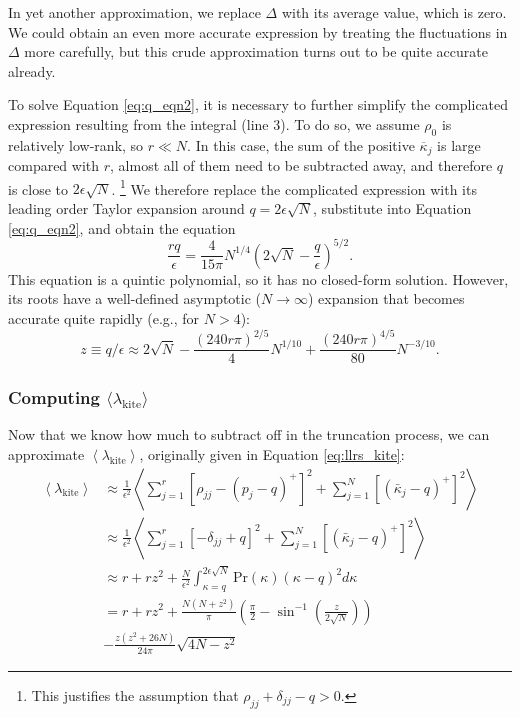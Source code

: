 \documentclass[aps,pra, twocolumn]{revtex4-1}
\newcommand{\expect}[1]{\ensuremath{\left\langle#1\right\rangle}}
\begin{document}
In yet another approximation, we replace $\Delta$ with its average value, which is zero.  We could obtain an even more accurate expression 
 by treating the fluctuations in $\Delta$ more carefully, but this crude approximation turns out to be quite accurate already.

To solve Equation \eqref{eq:q_eqn2}, it is necessary to further simplify the complicated expression resulting from the integral (line 3).  To do so, we 
assume  $\rho_0$ is relatively low-rank, so $r \ll N$.  In this case, the sum of the positive $\overline{\kappa}_j$ is large compared 
with $r$, almost all of them need to be subtracted away, and therefore $q$ is close to $2\epsilon\sqrt{N}$.  \footnote{This justifies the assumption that $\rho_{jj} + \delta_{jj} - q > 0$.} We therefore replace 
the complicated expression with its leading order Taylor expansion around $q=2\epsilon\sqrt{N}$, substitute into Equation \eqref{eq:q_eqn2}, and 
obtain the equation
\begin{equation}
\frac{rq}{\epsilon}  = \frac{4}{15\pi}N^{1/4}\left(2\sqrt{N}-\frac{q}{\epsilon}\right)^{5/2}.
\end{equation}
This equation is a quintic polynomial, so it has no closed-form solution.  However, its roots have a well-defined asymptotic ($N\to
\infty$) expansion that becomes accurate quite rapidly (e.g., for $N>4$):
\begin{equation}
\label{eq:truncation}
z \equiv q/\epsilon \approx 2\sqrt{N}-\frac{(240r\pi)^{2/5}}{4}N^{1/10}+\frac{(240r\pi)^{4/5}}{80}N^{-3/10}.
\end{equation}


\subsubsection{Computing $\langle \lambda_{\mathrm{kite}}\rangle$}
Now that we know how much to subtract off in the truncation process, we can approximate $\expect{\lambda_{\mathrm{kite}}}$, originally given in Equation \eqref{eq:llrs_kite}:
\begin{align}
\nonumber \expect{\lambda_{\mathrm{kite}}} &\approx  \frac{1}{\epsilon^{2}}\left\langle\sum_{j=1}^{r}[\rho_{jj}- (p_j-q)^{+}]^2 + \sum_{j=1}^{N}\left[(\bar{\kappa}_j-q)^+\right]^2 \right\rangle\\
\nonumber &\approx \frac{1}{\epsilon^{2}} \left\langle\sum_{j=1}^{r}[-\delta_{jj} +  q ]^2 + \sum_{j=1}^{N}\left[(\bar{\kappa}_j-q)^+\right]^2 \right\rangle\\
\nonumber  &\approx r + rz^2 + \frac{N}{\epsilon^{2}}\int_{\kappa=q}^{2\epsilon\sqrt{N}}{ \mathrm{Pr}(\kappa)(\kappa-q)^2 d\kappa} \\
\nonumber &=r + rz^{2} + \frac{N(N+z^{2})}{\pi}\left(\frac{\pi}{2} - \sin^{-1}\left(\frac{z}{2\sqrt{N}}\right)\right) \\
& - \frac{z(z^{2}+26N)}{24\pi}\sqrt{4N-z^{2}}
\end{align}
\end{document}
